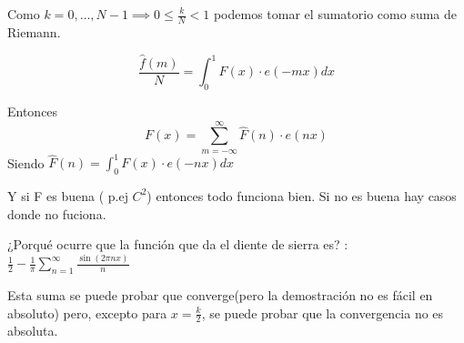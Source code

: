 Como $ k = 0 , \ldots , N-1 \implies 0\leq \frac{k}{N} < 1$ podemos tomar el sumatorio como suma de Riemann.

$$\frac{\widehat{f}(m)}{N} = \int_{0}^{1} F(x) \cdot e(-mx) dx$$

Entonces
$$F(x) = \sum_{m= -\infty}^{\infty} \widehat{F}(n) \cdot e(nx)$$
Siendo $\widehat{F}(n) = \int_{0}^{1} F(x) \cdot e(-nx) dx$

Y si F es buena ( p.ej $C^2$) entonces todo funciona bien.
Si no es buena hay casos donde no fuciona.

¿Porqué ocurre que la función que da el diente de sierra es? : $\frac{1}{2} - \frac{1}{\pi} \sum_{n=1}^{\infty} \frac{\sin(2\pi nx)}{n}$
	
Esta suma se puede probar que converge(pero la demostración no es fácil en absoluto) pero, excepto para $x = \frac{k}{2}$, se puede probar que la convergencia no es absoluta.

